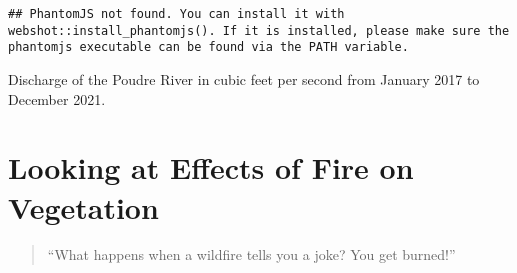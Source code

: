 \documentclass[
]{book}
\newenvironment{Shaded}{\begin{snugshade}}{\end{snugshade}}
\newcommand{\AttributeTok}[1]{\textcolor[rgb]{0.77,0.63,0.00}{#1}}
\newcommand{\ConstantTok}[1]{\textcolor[rgb]{0.00,0.00,0.00}{#1}}
\newcommand{\DecValTok}[1]{\textcolor[rgb]{0.00,0.00,0.81}{#1}}
\newcommand{\FunctionTok}[1]{\textcolor[rgb]{0.00,0.00,0.00}{#1}}
\newcommand{\NormalTok}[1]{#1}
\newcommand{\OtherTok}[1]{\textcolor[rgb]{0.56,0.35,0.01}{#1}}
\newcommand{\SpecialCharTok}[1]{\textcolor[rgb]{0.00,0.00,0.00}{#1}}
\newcommand{\StringTok}[1]{\textcolor[rgb]{0.31,0.60,0.02}{#1}}
\begin{document}
\begin{Shaded}
\end{Shaded}

\begin{verbatim}
## PhantomJS not found. You can install it with webshot::install_phantomjs(). If it is installed, please make sure the phantomjs executable can be found via the PATH variable.
\end{verbatim}

\label{fig:interactive}Discharge of the Poudre River in cubic feet per second from January 2017 to December 2021.

\hypertarget{looking-at-effects-of-fire-on-vegetation}{%
\chapter{Looking at Effects of Fire on Vegetation}\label{looking-at-effects-of-fire-on-vegetation}}

\begin{quote}
``What happens when a wildfire tells you a joke? You get burned!''
\end{quote}
\end{document}

